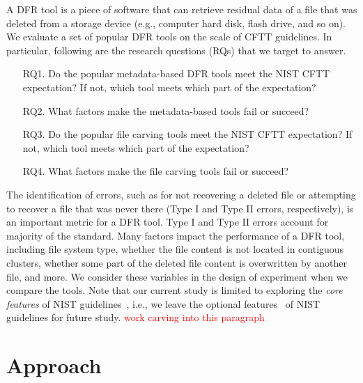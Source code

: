 \documentclass{ws-rv9x6}
\newcommand{\TODO}[1]{\textcolor{red}{#1}} %
\newenvironment{paraphrase}{\color{blue}}{\color{black}} %
\begin{document}
\begin{paraphrase}
A DFR tool is a piece of software that can retrieve residual data of a file that was deleted 
from a storage device (e.g., computer hard disk, flash drive, and so on). We evaluate a set of 
popular DFR tools on the scale of CFTT guidelines. 
In particular, following are the research questions (RQs) that we target to answer. 

\begin{itemize}
\item[RQ1.] Do the popular metadata-based DFR tools meet the NIST CFTT expectation? 
If not, which tool meets which part of the expectation? 

\item[RQ2.] What factors make the metadata-based tools fail or succeed?

\item[RQ3.] Do the popular file carving tools meet the NIST CFTT expectation? 
If not, which tool meets which part of the expectation? 

\item[RQ4.] What factors make the file carving tools fail or succeed?

\end{itemize}

The identification of errors, such as for not recovering a deleted file or attempting to recover a file that was never there 
(Type I and Type II errors, respectively), is an important metric for a DFR tool. 
Type I and Type II errors account for majority of the standard. Many factors impact the performance of a DFR tool, 
including file system type, whether the file content is not located in contiguous clusters, whether 
some part of the deleted file content is overwritten by another file, and more.
We consider these variables in the design of experiment when we compare the tools.
Note that our current study is limited to exploring the \emph{core features} of NIST guidelines~\cite{meta:dfr:standards}, 
i.e., we leave the optional features~\cite{meta:dfr:standards} of NIST guidelines for future study. \TODO{work carving into this paragraph}
\end{paraphrase}




\section{Approach}
\end{document}
